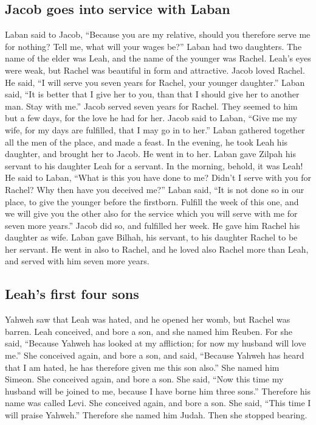 \hypertarget{jacob-goes-into-service-with-laban}{%
\subsection{Jacob goes into service with
Laban}\label{jacob-goes-into-service-with-laban}}

 Laban said to Jacob, ``Because you are my relative,
should you therefore serve me for nothing? Tell me, what will your wages
be?''  Laban had two daughters. The name of the elder was
Leah, and the name of the younger was Rachel.  Leah's
eyes were weak, but Rachel was beautiful in form and attractive.
 Jacob loved Rachel. He said, ``I will serve you seven
years for Rachel, your younger daughter.''  Laban said,
``It is better that I give her to you, than that I should give her to
another man. Stay with me.''  Jacob served seven years
for Rachel. They seemed to him but a few days, for the love he had for
her.  Jacob said to Laban, ``Give me my wife, for my days
are fulfilled, that I may go in to her.''  Laban gathered
together all the men of the place, and made a feast.  In
the evening, he took Leah his daughter, and brought her to Jacob. He
went in to her.  Laban gave Zilpah his servant to his
daughter Leah for a servant.  In the morning, behold, it
was Leah! He said to Laban, ``What is this you have done to me? Didn't I
serve with you for Rachel? Why then have you deceived me?''
 Laban said, ``It is not done so in our place, to give
the younger before the firstborn.  Fulfill the week of
this one, and we will give you the other also for the service which you
will serve with me for seven more years.''  Jacob did so,
and fulfilled her week. He gave him Rachel his daughter as wife.
 Laban gave Bilhah, his servant, to his daughter Rachel
to be her servant.  He went in also to Rachel, and he
loved also Rachel more than Leah, and served with him seven more years.

\hypertarget{leahs-first-four-sons}{%
\subsection{Leah's first four sons}\label{leahs-first-four-sons}}

 Yahweh saw that Leah was hated, and he opened her womb,
but Rachel was barren.  Leah conceived, and bore a son,
and she named him Reuben. For she said, ``Because Yahweh has looked at
my affliction; for now my husband will love me.''  She
conceived again, and bore a son, and said, ``Because Yahweh has heard
that I am hated, he has therefore given me this son also.'' She named
him Simeon.  She conceived again, and bore a son. She
said, ``Now this time my husband will be joined to me, because I have
borne him three sons.'' Therefore his name was called Levi.
 She conceived again, and bore a son. She said, ``This
time I will praise Yahweh.'' Therefore she named him Judah. Then she
stopped bearing.

